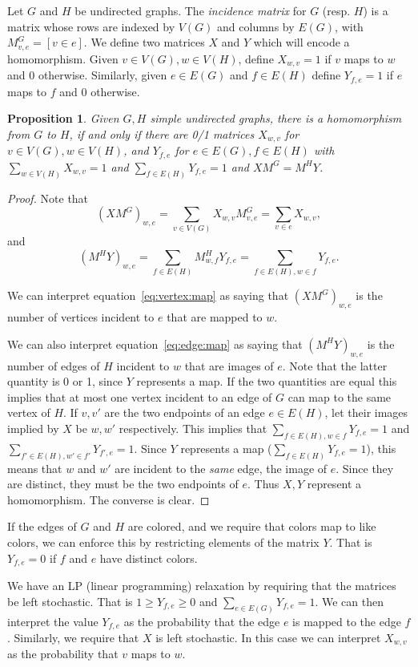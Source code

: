 \documentclass{article}
\newtheorem{proposition}{Proposition}
\begin{document}
Let $G$ and $H$ be undirected graphs.  The \emph{incidence matrix} for
$G$ (resp. $H$) is a matrix whose rows are indexed by $V(G)$ and
columns by $E(G)$, with $M_{v,e}^G = [v \in e]$.  We define two
matrices $X$ and $Y$ which will encode a homomorphism.  Given $v \in
V(G), w \in V(H)$, define $X_{w,v} = 1$ if $v$ maps to $w$ and 0
otherwise.  Similarly, given $e \in E(G)$ and $f \in E(H)$ define
$Y_{f,e} = 1$ if $e$ maps to $f$ and 0 otherwise.
\begin{proposition}
  Given $G, H$ simple undirected graphs, there is a homomorphism from
  $G$ to $H$, if and only if there are 0/1 matrices $X_{w,v}$ for
  $v \in V(G), w \in V(H)$, and $Y_{f,e}$ for $e \in E(G), f \in E(H)$
  with $\sum_{w \in V(H)} X_{w,v} = 1$ and
  $\sum_{f \in E(H)} Y_{f,e} = 1$ and $X M^G = M^H Y$.
\end{proposition}
\begin{proof}
  Note that
\begin{equation}
\label{eq:vertex:map}
(X M^G)_{w,e} = \sum_{v \in V(G)} X_{w,v} M^G_{v,e} = \sum_{v \in e}
X_{w,v},
\end{equation}
and
\begin{equation}
\label{eq:edge:map}
  (M^H Y)_{w, e} = \sum_{f \in E(H)} M^H_{w,f} Y_{f,e} = \sum_{f \in
    E(H), w \in f} Y_{f,e}.
\end{equation}

We can interpret equation~\eqref{eq:vertex:map} as saying that $(X
M^G)_{w,e}$ is the number of vertices incident to $e$ that are mapped
to $w$.

We can also interpret
equation~\eqref{eq:edge:map} as saying that $(M^H Y)_{w,e}$ is
the number of edges of $H$ incident to $w$ that are images of $e$.
Note that the latter quantity is 0 or 1, since $Y$ represents a map.
If the two quantities are equal this implies that at most one vertex
incident to an edge of $G$ can map to the same vertex of $H$.  If $v,
v'$ are the two endpoints of an edge $e \in E(H)$, let their images
implied by $X$ be $w, w'$ respectively.  This implies that
$\sum_{f \in E(H), w \in f} Y_{f,e} = 1$ and
$\sum_{f' \in E(H), w' \in f'} Y_{f',e} = 1$.
Since $Y$ represents a map ($\sum_{f \in E(H)} Y_{f,e} = 1$), this
means that $w$ and $w'$ are incident to the \emph{same} edge, the
image of $e$.  Since they are distinct, they must be the two endpoints
of $e$.  Thus $X, Y$ represent a homomorphism.  The converse is clear.
\end{proof}

If the edges of $G$ and $H$ are colored, and we require that colors
map to like colors, we can enforce this by restricting elements of the
matrix $Y$.  That is $Y_{f,e} = 0$ if $f$ and $e$ have distinct colors.

We have an LP (linear programming) relaxation by requiring that the
matrices be left stochastic.  That is $1 \ge Y_{f,e} \ge 0$ and
$\sum_{e \in E(G)} Y_{f,e} = 1$.  We can then interpret the value
$Y_{f,e}$ as the probability that the edge $e$ is mapped to the edge
$f$.  Similarly, we require that $X$ is left stochastic.  In this case
we can interpret $X_{w,v}$ as the probability that $v$ maps to $w$.
\end{document}
